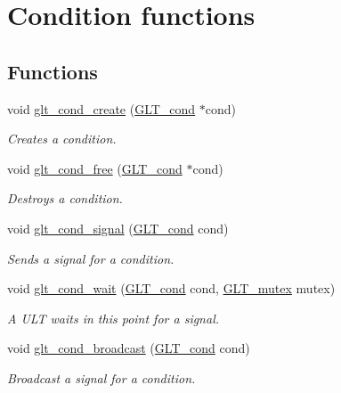 \hypertarget{group__CONDITION}{\section{Condition functions}
\label{group__CONDITION}
}
\subsection*{Functions}
\begin{DoxyCompactItemize}
\item 
void \hyperlink{group__CONDITION_ga0067216e7953ac7b093d998ab6afac55}{glt\-\_\-cond\-\_\-create} (\hyperlink{group__OBJECTS_ga075c19da7942eee02c7e0e55c44728ca}{G\-L\-T\-\_\-cond} $\ast$cond)
\begin{DoxyCompactList}\small\item\em Creates a condition. \end{DoxyCompactList}\item 
void \hyperlink{group__CONDITION_ga7186f2e869bbb87171a5c4562ac752a5}{glt\-\_\-cond\-\_\-free} (\hyperlink{group__OBJECTS_ga075c19da7942eee02c7e0e55c44728ca}{G\-L\-T\-\_\-cond} $\ast$cond)
\begin{DoxyCompactList}\small\item\em Destroys a condition. \end{DoxyCompactList}\item 
void \hyperlink{group__CONDITION_gaec5c2587a96261c51d2e1f40e3d21fcd}{glt\-\_\-cond\-\_\-signal} (\hyperlink{group__OBJECTS_ga075c19da7942eee02c7e0e55c44728ca}{G\-L\-T\-\_\-cond} cond)
\begin{DoxyCompactList}\small\item\em Sends a signal for a condition. \end{DoxyCompactList}\item 
void \hyperlink{group__CONDITION_ga0701bd2c880a4dbd1d282e2c9aa21ea1}{glt\-\_\-cond\-\_\-wait} (\hyperlink{group__OBJECTS_ga075c19da7942eee02c7e0e55c44728ca}{G\-L\-T\-\_\-cond} cond, \hyperlink{group__OBJECTS_ga17fa54e8d474f0313c629c34c119f0c8}{G\-L\-T\-\_\-mutex} mutex)
\begin{DoxyCompactList}\small\item\em A U\-L\-T waits in this point for a signal. \end{DoxyCompactList}\item 
void \hyperlink{group__CONDITION_gaf36e80119d53bc57a0347e3b42b0425f}{glt\-\_\-cond\-\_\-broadcast} (\hyperlink{group__OBJECTS_ga075c19da7942eee02c7e0e55c44728ca}{G\-L\-T\-\_\-cond} cond)
\begin{DoxyCompactList}\small\item\em Broadcast a signal for a condition. \end{DoxyCompactList}\end{DoxyCompactItemize}


